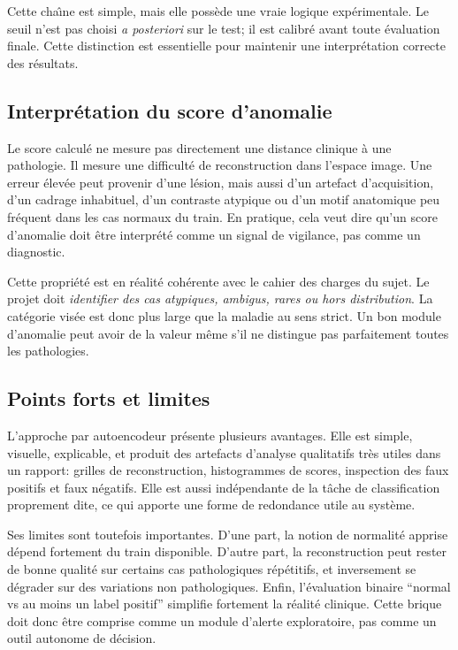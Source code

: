 \documentclass[11pt,a4paper]{article}
\begin{document}
Cette cha\^\i ne est simple, mais elle poss\`ede une vraie logique exp\'erimentale. Le seuil n'est pas choisi \emph{a posteriori} sur le test; il est calibr\'e avant toute \'evaluation finale. Cette distinction est essentielle pour maintenir une interpr\'etation correcte des r\'esultats.

\subsection{Interpr\'etation du score d'anomalie}
Le score calcul\'e ne mesure pas directement une distance clinique \`a une pathologie. Il mesure une difficult\'e de reconstruction dans l'espace image. Une erreur \'elev\'ee peut provenir d'une l\'esion, mais aussi d'un artefact d'acquisition, d'un cadrage inhabituel, d'un contraste atypique ou d'un motif anatomique peu fr\'equent dans les cas normaux du train. En pratique, cela veut dire qu'un score d'anomalie doit \^etre interpr\'et\'e comme un signal de vigilance, pas comme un diagnostic.

Cette propri\'et\'e est en r\'ealit\'e coh\'erente avec le cahier des charges du sujet. Le projet doit \emph{identifier des cas atypiques, ambigus, rares ou hors distribution}. La cat\'egorie vis\'ee est donc plus large que la maladie au sens strict. Un bon module d'anomalie peut avoir de la valeur m\^eme s'il ne distingue pas parfaitement toutes les pathologies.

\subsection{Points forts et limites}
L'approche par autoencodeur pr\'esente plusieurs avantages. Elle est simple, visuelle, explicable, et produit des artefacts d'analyse qualitatifs tr\`es utiles dans un rapport: grilles de reconstruction, histogrammes de scores, inspection des faux positifs et faux n\'egatifs. Elle est aussi ind\'ependante de la t\^ache de classification proprement dite, ce qui apporte une forme de redondance utile au syst\`eme.

Ses limites sont toutefois importantes. D'une part, la notion de normalit\'e apprise d\'epend fortement du train disponible. D'autre part, la reconstruction peut rester de bonne qualit\'e sur certains cas pathologiques r\'ep\'etitifs, et inversement se d\'egrader sur des variations non pathologiques. Enfin, l'\'evaluation binaire ``normal vs au moins un label positif'' simplifie fortement la r\'ealit\'e clinique. Cette brique doit donc \^etre comprise comme un module d'alerte exploratoire, pas comme un outil autonome de d\'ecision.
\end{document}
